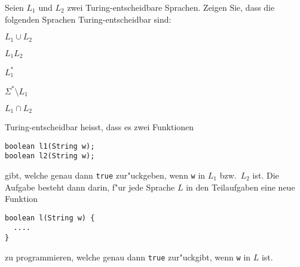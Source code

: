 Seien $L_1$ und $L_2$ zwei Turing-entscheidbare Sprachen. Zeigen Sie, dass
die folgenden Sprachen Turing-entscheidbar sind:
\begin{teilaufgaben}
\item $L_1\cup L_2$
\item $L_1L_2$
\item $L_1^*$
\item $\Sigma^*\setminus L_1$
\item $L_1\cap L_2$
\end{teilaufgaben}

\begin{hinweis}
Turing-entscheidbar heisst, dass es zwei Funktionen 
\begin{verbatim}
boolean l1(String w);
boolean l2(String w);
\end{verbatim}
gibt, welche genau dann \texttt{true} zur"uckgeben, wenn
\texttt{w} in $L_1$ bzw.~$L_2$ ist. Die Aufgabe
besteht dann darin, f"ur jede Sprache $L$ in den Teilaufgaben eine neue
Funktion
\begin{verbatim}
boolean l(String w) {
  ....
}
\end{verbatim}
zu programmieren, welche genau dann \texttt{true} zur"uckgibt, wenn
\texttt{w} in $L$ ist.
\end{hinweis}

